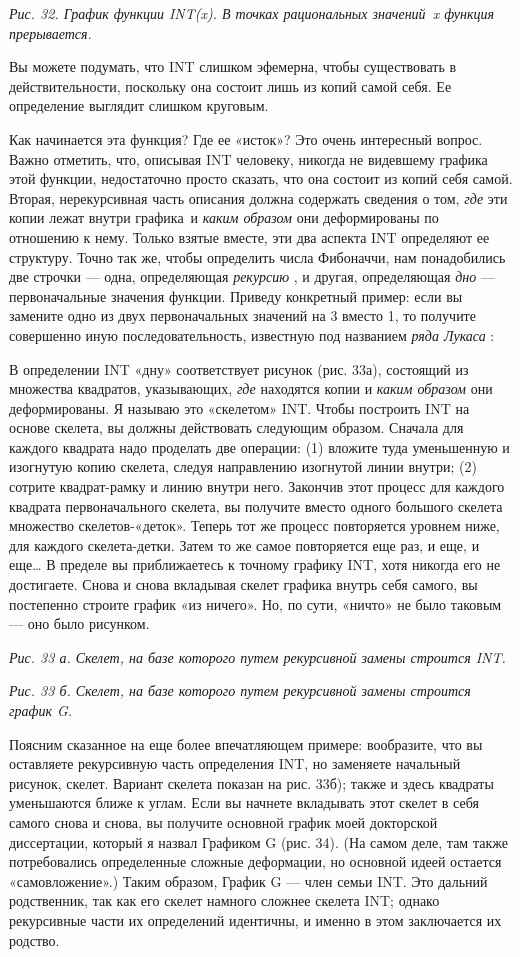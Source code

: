 \emph{Рис. 32. График функции INT(x). В точках рациональных значений~x функция прерывается.}

Вы можете подумать, что INT слишком эфемерна, чтобы существовать в действительности, поскольку она состоит лишь из копий самой себя. Ее определение выглядит слишком круговым.

Как начинается эта функция? Где ее «исток»? Это очень интересный вопрос. Важно отметить, что, описывая INT человеку, никогда не видевшему графика этой функции, недостаточно просто сказать, что она состоит из копий себя самой. Вторая, нерекурсивная часть описания должна содержать сведения о том, \emph{где} эти копии лежат внутри графика~и \emph{каким образом} они деформированы по отношению к нему. Только взятые вместе, эти два аспекта INT определяют ее структуру. Точно так же, чтобы определить числа Фибоначчи, нам понадобились две строчки --- одна, определяющая \emph{рекурсию} , и другая, определяющая \emph{дно} --- первоначальные значения функции. Приведу конкретный пример: если вы замените одно из двух первоначальных значений на 3 вместо 1, то получите совершенно иную последовательность, известную под названием \emph{ряда Лукаса} :

В определении INT «дну» соответствует рисунок (рис. 33а), состоящий из множества квадратов, указывающих, \emph{где} находятся копии и \emph{каким образом} они деформированы. Я называю это «скелетом» INT. Чтобы построить INT на основе скелета, вы должны действовать следующим образом. Сначала для каждого квадрата надо проделать две операции: (1) вложите туда уменьшенную и изогнутую копию скелета, следуя направлению изогнутой линии внутри; (2) сотрите квадрат-рамку и линию внутри него. Закончив этот процесс для каждого квадрата первоначального скелета, вы получите вместо одного большого скелета множество скелетов-«деток». Теперь тот же процесс повторяется уровнем ниже, для каждого скелета-детки. Затем то же самое повторяется еще раз, и еще, и еще\ldots{} В пределе вы приближаетесь к точному графику INT, хотя никогда его не достигаете. Снова и снова вкладывая скелет графика внутрь себя самого, вы постепенно строите график «из ничего». Но, по сути, «ничто» не было таковым --- оно было рисунком.

\emph{Рис. 33 а. Скелет, на базе которого путем рекурсивной замены строится INT.}

\emph{Рис. 33 б. Скелет, на базе которого путем рекурсивной замены строится график G.}

Поясним сказанное на еще более впечатляющем примере: вообразите, что вы оставляете рекурсивную часть определения INT, но заменяете начальный рисунок, скелет. Вариант скелета показан на рис. 33б); также и здесь квадраты уменьшаются ближе к углам. Если вы начнете вкладывать этот скелет в себя самого снова и снова, вы получите основной график моей докторской диссертации, который я назвал Графиком G (рис. 34). (На самом деле, там также потребовались определенные сложные деформации, но основной идеей остается «самовложение».) Таким образом, График G --- член семьи INT. Это дальний родственник, так как его скелет намного сложнее скелета INT; однако рекурсивные части их определений идентичны, и именно в этом заключается их родство.

